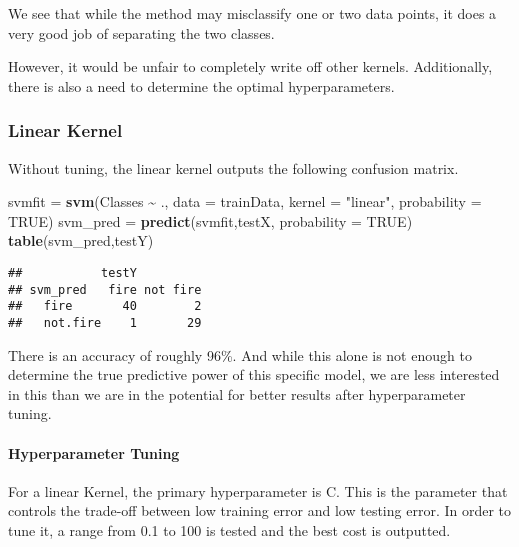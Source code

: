 \documentclass[
]{article}
\newenvironment{Shaded}{\begin{snugshade}}{\end{snugshade}}
\newcommand{\AttributeTok}[1]{\textcolor[rgb]{0.13,0.29,0.53}{#1}}
\newcommand{\ConstantTok}[1]{\textcolor[rgb]{0.56,0.35,0.01}{#1}}
\newcommand{\DecValTok}[1]{\textcolor[rgb]{0.00,0.00,0.81}{#1}}
\newcommand{\FunctionTok}[1]{\textcolor[rgb]{0.13,0.29,0.53}{\textbf{#1}}}
\newcommand{\NormalTok}[1]{#1}
\newcommand{\OtherTok}[1]{\textcolor[rgb]{0.56,0.35,0.01}{#1}}
\newcommand{\SpecialCharTok}[1]{\textcolor[rgb]{0.81,0.36,0.00}{\textbf{#1}}}
\newcommand{\StringTok}[1]{\textcolor[rgb]{0.31,0.60,0.02}{#1}}
\begin{document}
We see that while the method may misclassify one or two data points, it
does a very good job of separating the two classes.

However, it would be unfair to completely write off other kernels.
Additionally, there is also a need to determine the optimal
hyperparameters.

\subsubsection{Linear Kernel}\label{linear-kernel}

Without tuning, the linear kernel outputs the following confusion
matrix.

\begin{Shaded}
\begin{Highlighting}[]
\NormalTok{svmfit }\OtherTok{=} \FunctionTok{svm}\NormalTok{(Classes }\SpecialCharTok{\textasciitilde{}}\NormalTok{ ., }\AttributeTok{data =}\NormalTok{ trainData, }\AttributeTok{kernel =} \StringTok{"linear"}\NormalTok{, }\AttributeTok{probability =} \ConstantTok{TRUE}\NormalTok{)}
\NormalTok{svm\_pred }\OtherTok{=} \FunctionTok{predict}\NormalTok{(svmfit,testX, }\AttributeTok{probability =} \ConstantTok{TRUE}\NormalTok{)}
\FunctionTok{table}\NormalTok{(svm\_pred,testY)}
\end{Highlighting}
\end{Shaded}

\begin{verbatim}
##           testY
## svm_pred   fire not fire
##   fire       40        2
##   not.fire    1       29
\end{verbatim}

There is an accuracy of roughly 96\%. And while this alone is not enough
to determine the true predictive power of this specific model, we are
less interested in this than we are in the potential for better results
after hyperparameter tuning.

\paragraph{Hyperparameter Tuning}\label{hyperparameter-tuning}

For a linear Kernel, the primary hyperparameter is C. This is the
parameter that controls the trade-off between low training error and low
testing error. In order to tune it, a range from 0.1 to 100 is tested
and the best cost is outputted.

\begin{Shaded}
\end{Shaded}
\end{document}
